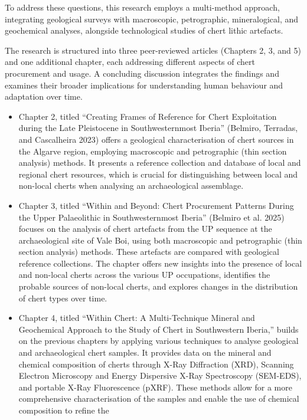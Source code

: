 \documentclass[
  a4paper,
  DIV=11,
  numbers=noendperiod]{scrreprt}
\begin{document}
To address these questions, this research employs a multi-method
approach, integrating geological surveys with macroscopic, petrographic,
mineralogical, and geochemical analyses, alongside technological studies
of chert lithic artefacts.

The research is structured into three peer-reviewed articles (Chapters
2, 3, and 5) and one additional chapter, each addressing different
aspects of chert procurement and usage. A concluding discussion
integrates the findings and examines their broader implications for
understanding human behaviour and adaptation over time.

\begin{itemize}
\item
  Chapter 2, titled ``Creating Frames of Reference for Chert
  Exploitation during the Late Pleistocene in Southwesternmost Iberia''
  (Belmiro, Terradas, and Cascalheira 2023) offers a geological
  characterisation of chert sources in the Algarve region, employing
  macroscopic and petrographic (thin section analysis) methods. It
  presents a reference collection and database of local and regional
  chert resources, which is crucial for distinguishing between local and
  non-local cherts when analysing an archaeological assemblage.
\item
  Chapter 3, titled ``Within and Beyond: Chert Procurement Patterns
  During the Upper Palaeolithic in Southwesternmost Iberia'' (Belmiro et
  al. 2025) focuses on the analysis of chert artefacts from the UP
  sequence at the archaeological site of Vale Boi, using both
  macroscopic and petrographic (thin section analysis) methods. These
  artefacts are compared with geological reference collections. The
  chapter offers new insights into the presence of local and non-local
  cherts across the various UP occupations, identifies the probable
  sources of non-local cherts, and explores changes in the distribution
  of chert types over time.
\item
  Chapter 4, titled ``Within Chert: A Multi-Technique Mineral and
  Geochemical Approach to the Study of Chert in Southwestern Iberia,''
  builds on the previous chapters by applying various techniques to
  analyse geological and archaeological chert samples. It provides data
  on the mineral and chemical composition of cherts through X-Ray
  Diffraction (XRD), Scanning Electron Microscopy and Energy Dispersive
  X-Ray Spectroscopy (SEM-EDS), and portable X-Ray Fluorescence (pXRF).
  These methods allow for a more comprehensive characterisation of the
  samples and enable the use of chemical composition to refine the

\end{itemize}
\end{document}

